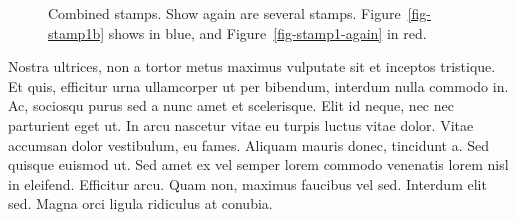\documentclass[
  9pt,
  letterpaper,
  DIV=11,
  numbers=noendperiod]{scrartcl}
\begin{document}
\begin{figure}
\begin{minipage}[t]{0.50\linewidth}
{\centering 


}

\end{minipage}%

\caption{\label{fig-combined}Combined stamps. Show again are several
stamps. Figure~\ref{fig-stamp1b} shows in blue, and
Figure~\ref{fig-stamp1-again} in red.}

\end{figure}

Nostra ultrices, non a tortor metus maximus vulputate sit et inceptos
tristique. Et quis, efficitur urna ullamcorper ut per bibendum, interdum
nulla commodo in. Ac, sociosqu purus sed a nunc amet et scelerisque.
Elit id neque, nec nec parturient eget ut. In arcu nascetur vitae eu
turpis luctus vitae dolor. Vitae accumsan dolor vestibulum, eu fames.
Aliquam mauris donec, tincidunt a. Sed quisque euismod ut. Sed amet ex
vel semper lorem commodo venenatis lorem nisl in eleifend. Efficitur
arcu. Quam non, maximus faucibus vel sed. Interdum elit sed. Magna orci
ligula ridiculus at conubia.

\newpage{}
\end{document}
